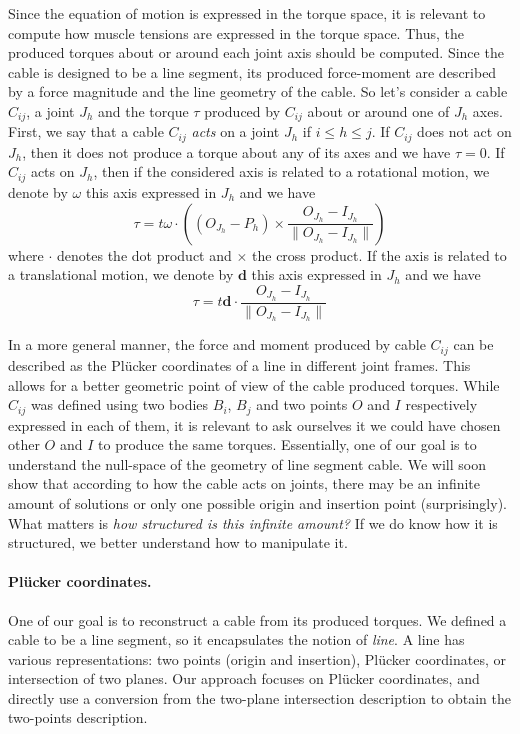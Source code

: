 Since the equation of motion is expressed in the torque space, it is relevant to compute how muscle tensions are expressed in the torque space. Thus, the produced torques about or around each joint axis should be computed. Since the cable is designed to be a line segment, its produced force-moment are described by a force magnitude and the line geometry of the cable. So let's consider a cable $C_{ij}$, a joint $J_h$ and the torque $\tau$ produced by $C_{ij}$ about or around one of $J_h$ axes. First, we say that a cable $C_{ij}$ \emph{acts} on a joint $J_h$ if $i \leq h \leq j$. If $C_{ij}$ does not act on $J_h$, then it does not produce a torque about any of its axes and we have $\tau = 0$. If $C_{ij}$ acts on $J_h$, then if the considered axis is related to a rotational motion, we denote by $\omega$ this axis expressed in $J_h$ and we have
$$\tau = t\omega \cdot \left((O_{J_h} - P_h) \times \frac{O_{J_h} - I_{J_h}}{\| O_{J_h} - I_{J_h} \|} \right)$$
where $\cdot$ denotes the dot product and $\times$ the cross product. 
If the axis is related to a translational motion, we denote by $\mathbf{d}$ this axis expressed in $J_h$ and we have
$$\tau = t \mathbf{d} \cdot \frac{O_{J_h} - I_{J_h}}{\| O_{J_h} - I_{J_h} \|}$$

In a more general manner, the force and moment produced by cable $C_{ij}$ can be described as the Plücker coordinates of a line in different joint frames. This allows for a better geometric point of view of the cable produced torques. While $C_{ij}$ was defined using two bodies $B_i$, $B_j$ and two points $O$ and $I$ respectively expressed in each of them, it is relevant to ask ourselves it we could have chosen other $O$ and $I$ to produce the same torques. Essentially, one of our goal is to understand the null-space of the geometry of line segment cable. We will soon show that according to how the cable acts on joints, there may be an infinite amount of solutions or only one possible origin and insertion point (surprisingly). What matters is \emph{how structured is this infinite amount?} If we do know how it is structured, we better understand how to manipulate it.

\paragraph*{Plücker coordinates.}
One of our goal is to reconstruct a cable from its produced torques. We defined a cable to be a line segment, so it encapsulates the notion of \emph{line}. A line has various representations: two points (origin and insertion), Plücker coordinates, or intersection of two planes. Our approach focuses on Plücker coordinates, and directly use a conversion from the two-plane intersection description to obtain the two-points description. 

